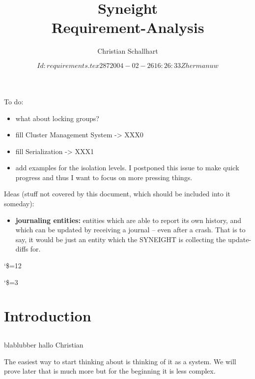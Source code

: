 \documentclass[a4paper, 12pt]{book}
\begin{document}
\begin{titlepage}
To do:
\begin{itemize}
\item what about locking groups?
\item fill Cluster Management System -> XXX0
\item fill Serialization -> XXX1
\item add examples for the isolation levels. I postponed this issue to
make quick progress and thus I want to focus on more pressing things. 
\end{itemize}


Ideas (stuff not covered by this document, which should be included
into it someday):
\begin{itemize}
\item \textbf{journaling entities:} entities which are able to report its own
history, and which can be updated by receiving a journal -- even after
a crash. That is to say, it would be just an entity which the
SYNEIGHT is collecting the update-diffs for.
\end{itemize}
\end{titlepage}

\title{Syneight\\Requirement-Analysis}
\author{Christian Schallhart}
\catcode`\$=12
\date{\texttt{$Id: requirements.tex 287 2004-02-26 16:26:33Z hermanuw
$}}
\catcode`\$=3
\maketitle

\newpage

\tableofcontents

\newpage

\chapter{Introduction}


\section{\SYNEIGHT}
\begin{question*}{blablubber}
hallo Christian
\end{question*}

The easiest way to start thinking about \SYNEIGHT is thinking of
it as a \DSM system. We will prove later that \SYNEIGHT is much more but
for the beginning it is less complex.\\
\end{document}
